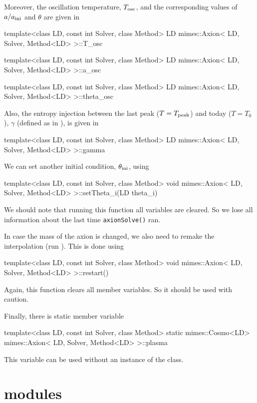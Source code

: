 \documentclass[11pt,a4paper]{article}
\begin{document}
Moreover, the oscillation temperature, $T_{\rm osc}{}$, and the corresponding values of $a/a_{\rm ini}{}$ and $\theta$ are given in
%
\begin{cpp}
	template<class LD, const int Solver, class Method>
	LD mimes::Axion< LD, Solver, Method<LD> >::T_osc
	
	template<class LD, const int Solver, class Method>
	LD mimes::Axion< LD, Solver, Method<LD> >::a_osc

	template<class LD, const int Solver, class Method>
	LD mimes::Axion< LD, Solver, Method<LD> >::theta_osc
\end{cpp}
%

Also, the entropy injection between the last peak ($T=T_{\rm peak}$) and today ($T=T_0$), $\gamma$ (defined as in ), is given in 
%
\begin{cpp}
	template<class LD, const int Solver, class Method>
	LD mimes::Axion< LD, Solver, Method<LD> >::gamma
\end{cpp}



We can set another initial condition, $\theta_{\rm ini}{}$, using 
%
\begin{cpp}
	template<class LD, const int Solver, class Method>
	void mimes::Axion< LD, Solver, Method<LD> >::setTheta_i(LD theta_i)
\end{cpp}
%
We should note that running this function all variables are cleared. So we lose all information about the last time {\tt axionSolve()} ran. 

In case the mass of the axion is changed, we also need to remake  the interpolation (\ie run ). This is done using
%
\begin{cpp}
	template<class LD, const int Solver, class Method>
	void mimes::Axion< LD, Solver, Method<LD> >::restart()
\end{cpp}
%
Again, this function clears all member variables. So it should be used with caution.


Finally, there is static  member variable
%
\begin{cpp}
	template<class LD, const int Solver, class Method>
	static mimes::Cosmo<LD> mimes::Axion< LD, Solver, Method<LD> >::plasma
\end{cpp}
%
This variable can be used without an instance of the  class.

\section{\PY modules}\label{app:modules}
\setcounter{equation}{0}
\end{document}
